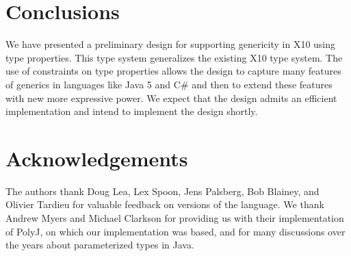 \documentclass[preprint,nocopyrightspace,9pt]{sigplanconf}
\begin{document}
\section{Conclusions}

We have presented a preliminary design for supporting genericity
in X10 using type properties.  This type system generalizes the
existing X10 type system.  The use of constraints on type
properties allows
the design to capture many features of generics in languages
like Java 5 and C\# and then to extend these features with new
more expressive power.
We expect that the design admits an efficient
implementation and intend to implement the design shortly.

\section{Acknowledgements} 

The authors thank
Doug Lea, Lex Spoon, Jens Palsberg, Bob Blainey, and Olivier Tardieu
for valuable feedback on versions of the language.
We thank 
Andrew Myers and
Michael Clarkson for providing us with their implementation of
PolyJ, on which our implementation was based, and for many
discussions over the years about parameterized types in Java.





% 
\end{document}

